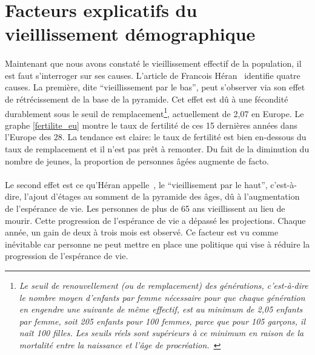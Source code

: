 \section{Facteurs explicatifs du vieillissement démographique}
\paragraph{}Maintenant que nous avons constaté le vieillissement effectif de la population, il est faut s'interroger sur ses causes. L’article de Francois Héran~\citep[pp.1]{heran} identifie quatre causes. La première, dite “vieillissement par le bas”, peut s'observer via son effet de rétrécissement de la base de la pyramide. Cet effet est dû à une fécondité durablement sous le seuil de remplacement\footnote{\textit{Le seuil de renouvellement (ou de remplacement) des générations, c'est-à-dire le nombre moyen d'enfants par femme nécessaire pour que chaque génération en engendre une suivante de même effectif, est au minimum de 2,05 enfants par femme, soit 205 enfants pour 100 femmes, parce que pour 105 garçons, il naît 100 filles. Les seuils réels sont supérieurs à ce minimum en raison de la mortalité entre la naissance et l'âge de procréation.}~\citep{renouvellement}
}, actuellement de 2,07 en Europe. Le graphe \ref{fertilite_eu} montre le taux de fertilité de ces 15 dernières années dans l’Europe des 28. La tendance est claire: le taux de fertilité est bien en-dessous du taux de remplacement et il n’est pas prêt à remonter. Du fait de la diminution du nombre de jeunes, la proportion de personnes âgées augmente de facto.  

\paragraph{}Le second effet est ce qu’Héran appelle~\citep[pp.1]{heran}, le “vieillisement par le haut”, c’est-à-dire, l’ajout d’étages au somment de la pyramide des âges, dû à l’augmentation de l’espérance de vie.  Les personnes de plus de 65 ans vieillissent au lieu de mourir. Cette progression de l’espérance de vie a dépassé les projections. Chaque année, un gain de deux à trois mois est observé. Ce facteur est vu comme inévitable car personne ne peut mettre en place une politique qui vise à réduire la progression de l’espérance de vie.

